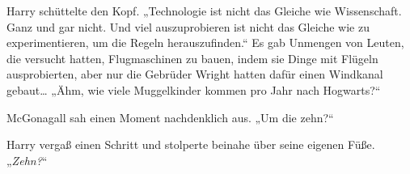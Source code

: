 Harry schüttelte den Kopf. „Technologie ist nicht das Gleiche wie Wissenschaft. Ganz und gar nicht. Und viel auszuprobieren ist nicht das Gleiche wie zu experimentieren, um die Regeln herauszufinden.“ Es gab Unmengen von Leuten, die versucht hatten, Flugmaschinen zu bauen, indem sie Dinge mit Flügeln ausprobierten, aber nur die Gebrüder Wright hatten dafür einen Windkanal gebaut… „Ähm, wie viele Muggelkinder kommen pro Jahr nach Hogwarts?“

McGonagall sah einen Moment nachdenklich aus. „Um die zehn?“

Harry vergaß einen Schritt und stolperte beinahe über seine eigenen Füße. „\emph{Zehn?}“

